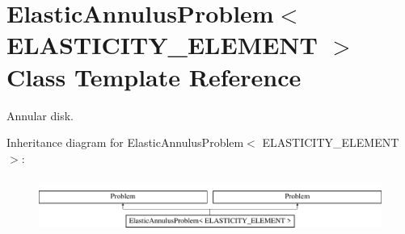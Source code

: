 \hypertarget{classElasticAnnulusProblem}{}\section{Elastic\+Annulus\+Problem$<$ E\+L\+A\+S\+T\+I\+C\+I\+T\+Y\+\_\+\+E\+L\+E\+M\+E\+NT $>$ Class Template Reference}
\label{classElasticAnnulusProblem}


Annular disk.  


Inheritance diagram for Elastic\+Annulus\+Problem$<$ E\+L\+A\+S\+T\+I\+C\+I\+T\+Y\+\_\+\+E\+L\+E\+M\+E\+NT $>$\+:\begin{figure}[H]
\begin{center}
\leavevmode
\includegraphics[height=1.818182cm]{classElasticAnnulusProblem}
\end{center}
\end{figure}
